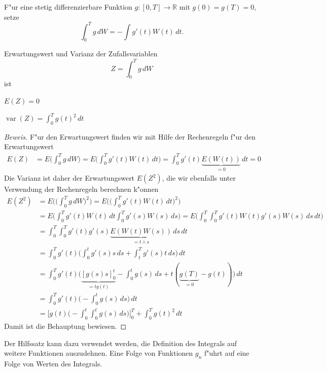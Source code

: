 \begin{definition}
F"ur eine stetig differenzierbare Funktion $g\colon[0,T]\to \mathbb R$ 
mit $g(0)=g(T)=0$, setze
\[
\int_0^T g\,dW = -\int g'(t) W(t)\,dt.
\]
\end{definition}

\begin{hilfssatz}
Erwartungswert und Varianz der Zufallsvariablen
\[
Z=\int_0^T g\,dW
\]
ist
\begin{compactenum}
\item $E(Z)=0$
\item $\operatorname{var}(Z)=\int_0^Tg(t)^2\,dt$
\end{compactenum}
\end{hilfssatz}

\begin{proof}[Beweis]
F"ur den Erwartungswert finden wir mit Hilfe der Rechenregeln f"ur den
Erwartungswert
\begin{align*}
E(Z)
&=
E\biggl(\int_0^T g\,dW\biggr)
=
E\biggl(
\int_0^T g'(t) W(t)\,dt
\biggr)
=
\int_0^T g'(t) \underbrace{E(W(t))}_{=0}\,dt=0
\end{align*}
Die Varianz ist daher der Erwartungswert $E(Z^2)$, die wir ebenfalls unter
Verwendung der Rechenregeln berechnen k"onnen
\begin{align*}
E(Z^2)
&=
E\biggl(\biggl(\int_0^T g\,dW\biggr)^2\biggr)
=
E\biggl(
\biggl(
\int_0^T g'(t)W(t)\,dt
\biggr)^2
\biggr)
\\
&=
E\biggl(
\int_0^T g'(t)W(t)\,dt
\int_0^T g'(s)W(s)\,ds
\biggr)
=
E\biggl(
\int_0^T \int_0^T g'(t)W(t) g'(s)W(s) \,ds \,dt
\biggr)
\\
&=
\int_0^T\int_0^Tg'(t)g'(s) \underbrace{E(W(t)W(s))}_{=t\wedge s}\,ds\,dt
\\
&=
\int_0^Tg'(t) \biggl(\int_0^t g'(s) s\,ds + \int_t^T g'(s)t\,ds\biggr)
\,dt
\\
&=
\int_0^T g'(t)\biggl(
\underbrace{[g(s)s]_0^t}_{=tg(t)}-\int_0^t g(s)\,ds+t(\underbrace{g(T)}_{=0}-g(t))
\biggr)\,dt
\\
&=
\int_0^T g'(t)\biggl(-\int_0^t g(s)\,ds\biggr)\,dt
\\
&=
\biggl[
g(t)\biggl(-\int_0^t\int_0^tg(s)\,ds\biggr)
\biggr]_0^T
+
\int_0^Tg(t)^2\,dt
\end{align*}
Damit ist die Behauptung bewiesen.
\end{proof}
Der Hilfssatz kann dazu verwendet werden, die Definition des Integrals auf
weitere Funktionen auszudehnen.
Eine Folge von Funktionen $g_n$ f"uhrt auf eine Folge von Werten des
Integrals. 
